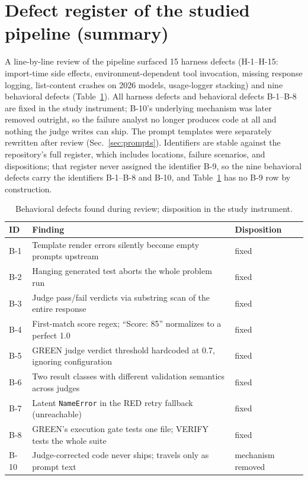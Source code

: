 

\section{Defect register of the studied pipeline (summary)}
\label{app:register}

A line-by-line review of the pipeline surfaced 15 harness defects (H-1--H-15: import-time
side effects, environment-dependent tool invocation, missing response logging, list-content
crashes on 2026 models, usage-logger stacking) and nine behavioral defects
(Table~\ref{tab:register}). All harness defects and behavioral defects B-1--B-8 are fixed in
the study instrument; B-10's underlying mechanism was later removed outright, so the failure
analyst no longer produces code at all and nothing the judge writes can ship. The
prompt templates were separately rewritten after review (Sec.~\ref{sec:prompts}). Identifiers are stable against the
repository's full register, which includes locations, failure scenarios, and dispositions;
that register never assigned the identifier B-9, so the nine behavioral defects carry the
identifiers B-1--B-8 and B-10, and Table~\ref{tab:register} has no B-9 row by construction.

\begin{table}[t]
\centering
\caption{Behavioral defects found during review; disposition in the study instrument.}
\label{tab:register}
\small
\begin{tabularx}{\textwidth}{lXl}
\toprule
ID & Finding & Disposition \\
\midrule
B-1 & Template render errors silently become empty prompts upstream & fixed \\
B-2 & Hanging generated test aborts the whole problem run & fixed \\
B-3 & Judge pass/fail verdicts via substring scan of the entire response & fixed \\
B-4 & First-match score regex; ``Score: 85'' normalizes to a perfect 1.0 & fixed \\
B-5 & GREEN judge verdict threshold hardcoded at 0.7, ignoring configuration & fixed \\
B-6 & Two result classes with different validation semantics across judges & fixed \\
B-7 & Latent \texttt{NameError} in the RED retry fallback (unreachable) & fixed \\
B-8 & GREEN's execution gate tests one file; VERIFY tests the whole suite & fixed \\
B-10 & Judge-corrected code never ships; travels only as prompt text & mechanism removed \\
\bottomrule
\end{tabularx}
\end{table}

